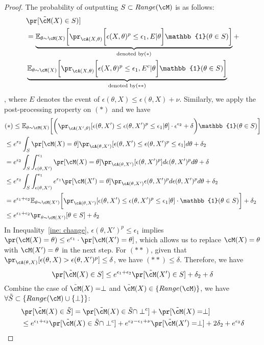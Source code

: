 \begin{proof}
 The probability of outputting $S \subset Range(\cM)$ is as follows:
 \begin{align}
 & \pr[\tilde{\cM}(X)\in S)] \\
 &= \underbrace{\mathbb{E}_{\theta \sim \cM(X)}\bigg[ \pr_{\cA(X,\theta)}\bigg[  \epsilon(X, \theta)^p\leq \epsilon_1, E|\theta \bigg]\mathbb{1}(\theta\in S)\bigg]}_{\text{denoted by} (*)} + \\
 & \underbrace{\mathbb{E}_{\theta \sim \cM(X)}\bigg[ \pr_{\cA(X,\theta)}\bigg[  \epsilon(X, \theta)^p\leq \epsilon_1, E^c |\theta\bigg] \mathbb{1}(\theta\in S)\bigg]}_{\text{denoted by} (**)}
\end{align}, where $E$ denotes the event of $\epsilon(\theta, X)\leq \epsilon( \theta,X) +\nu$.
Similarly, we apply the post-processing property on $(*)$ and we have
\begin{align}
&(*)\leq \mathbb{E}_{\theta \sim \cM(X)}\bigg[\bigg( \pr_{\cA(X',\theta)}[\epsilon(\theta, X')\leq \epsilon(\theta, X')^p\leq \epsilon_1|\theta]\cdot \epsilon^{\epsilon_2}+\delta\bigg)
\mathbb{1}(\theta \in S)\bigg]\\
&\leq e^{\epsilon_2}\int_S \pr[\cM(X)=\theta]\pr_{\cA(\theta, X')}[\epsilon(\theta, X')\leq \epsilon(\theta, X')^p \leq \epsilon_1]d\theta + \delta_2\\
&=e^{\epsilon_2}\int_S \int_{\epsilon(\theta, X')}^{\epsilon_1} \pr[\cM(X)=\theta]\pr_{\cA(\theta, X')}[\epsilon(\theta, X')^p]d \epsilon(\theta, X')^p d\theta + \delta \label{ine: change}\\
&\leq e^{\epsilon_2}\int_S \int_{\epsilon(\theta, X')}^{\epsilon_1}e^{\epsilon_1} \pr[\cM(X')=\theta] \pr_{\cA(\theta, X')}
\epsilon(\theta, X')^p d\epsilon(\theta, X')^pd\theta +\delta_2\\
&=e^{\epsilon_1 +\epsilon_2}\mathbb{E}_{\theta\sim \cM(X')}\bigg[ \pr_{\cA(\theta, X')}[\epsilon(\theta,X')\leq \epsilon(\theta, X')^p \leq \epsilon_1|\theta]\cdot \mathbb{1}(\theta \in S)\bigg] + \delta_2\\
&\leq e^{\epsilon_1 + \epsilon_2} \pr_{\theta \sim \cM(X')}[\theta \in S]+\delta_2
\end{align}
In Inequality~\ref{ine: change}, $\epsilon(\theta, X')^p \leq \epsilon_1 $ implies $\pr(\cM(X)=\theta)\leq e^{\epsilon_1}\cdot \pr[\cM(X')=\theta]$, which allows us to replace $\cM(X)=\theta$ with $\cM(X')=\theta$ in the next step.
For $(**)$, given that $\pr_{\cA(\theta, X)}[\epsilon(\theta, X)>\epsilon(\theta,X')^p]\leq \delta$, we have $(**)\leq \delta$. Therefore, we have 
\[\pr[\tilde{\cM}(X)\in S] \leq e^{\epsilon_1 + \epsilon_2 } \pr[\tilde{\cM}(X')\in S] + \delta_2 + \delta
\]
Combine the case of $\tilde{\cM}(X)=\perp$ and $\tilde{\cM}(X)\in \{Range(\cM)\}$, we have $\forall \tilde{S} \subset \{ Range(\cM) \cup \{\perp\}\}$:
\begin{align*}
    &\pr[\tilde{\cM}(X)\in \tilde{S}] = \pr[\tilde{\cM}(X) \in \tilde{S} \cap \perp^c] + \pr[\tilde{\cM}(X) = \perp]\\
    &\leq e^{\epsilon_1 + \epsilon_2}\pr[\tilde{\cM}(X) \in \tilde{S} \cap \perp^c] + e^{\epsilon_2 -\epsilon_1 +\nu}\pr[\tilde{\cM}(X')=\perp] + 2\delta_2 + e^{\epsilon_2} \delta
\end{align*}
\end{proof}